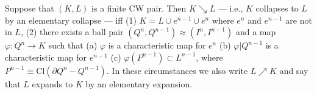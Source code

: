 Suppose that $(K, L)$ is a finite CW pair. Then $K \searrow L$ --- i.e., $K$ collapses to $L$ by an elementary collapse --- iff
(1) $K = L \cup e^{n-1} \cup e^n$ where $e^n$ and $e^{n-1}$ are not in $L$,
(2) there exists a ball pair $(Q^n, Q^{n-1}) \approx (I^n, I^{n-1})$ and a map $\varphi: Q^n \rightarrow K$ such that
(a) $\varphi$ is a characteristic map for $e^n$
(b) $\varphi|Q^{n-1}$ is a characteristic map for $e^{n-1}$
(c) $\varphi(P^{n-1}) \subset L^{n-1}$, where $P^{n-1} \equiv \text{Cl}(\partial Q^n - Q^{n-1})$.
In these circumstances we also write $L \nearrow K$ and say that $L$ expands to $K$ by an elementary expansion.

